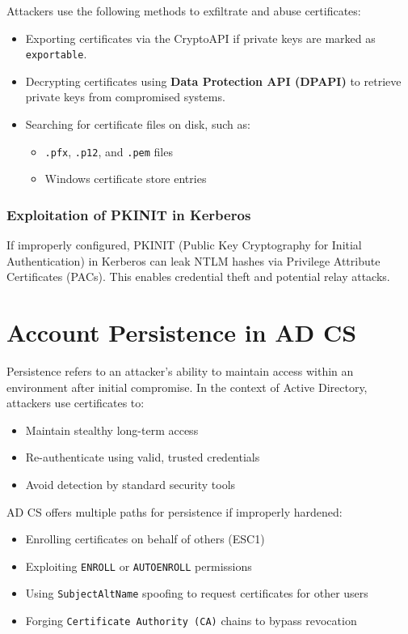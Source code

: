 Attackers use the following methods to exfiltrate and abuse certificates:
\begin{itemize}
    \item Exporting certificates via the CryptoAPI if private keys are marked as \texttt{exportable}.
    \item Decrypting certificates using \textbf{Data Protection API (DPAPI)} to retrieve private keys from compromised systems.
    \item Searching for certificate files on disk, such as:
    \begin{itemize}
        \item \texttt{.pfx}, \texttt{.p12}, and \texttt{.pem} files
        \item Windows certificate store entries
    \end{itemize}
\end{itemize}

\subsubsection{Exploitation of PKINIT in Kerberos}

If improperly configured, PKINIT (Public Key Cryptography for Initial Authentication) in Kerberos can leak NTLM hashes via Privilege Attribute Certificates (PACs). This enables credential theft and potential relay attacks.

\section{Account Persistence in AD CS}

Persistence refers to an attacker’s ability to maintain access within an environment after initial compromise. In the context of Active Directory, attackers use certificates to:
\begin{itemize}
    \item Maintain stealthy long-term access
    \item Re-authenticate using valid, trusted credentials
    \item Avoid detection by standard security tools
\end{itemize}

AD CS offers multiple paths for persistence if improperly hardened:
\begin{itemize}
    \item Enrolling certificates on behalf of others (ESC1)
    \item Exploiting \texttt{ENROLL} or \texttt{AUTOENROLL} permissions
    \item Using \texttt{SubjectAltName} spoofing to request certificates for other users
    \item Forging \texttt{Certificate Authority (CA)} chains to bypass revocation
\end{itemize}

